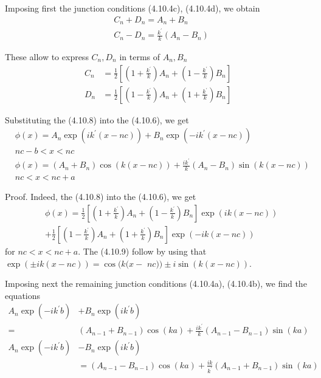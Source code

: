\documentclass{article}
\begin{document}
Imposing first the junction conditions (4.10.4c), (4.10.4d), we obtain
$$
\begin{align*}
& C_{n}+D_{n}=A_{n}+B_{n}  \tag{4.10.7a}\\
& C_{n}-D_{n}=\frac{k^{\prime}}{k}\left(A_{n}-B_{n}\right) \tag{4.10.7b}
\end{align*}
$$

These allow to express $C_{n}, D_{n}$ in terms of $A_{n}, B_{n}$
$$
\begin{align*}
C_{n} & =\frac{1}{2}\left[\left(1+\frac{k^{\prime}}{k}\right) A_{n}+\left(1-\frac{k^{\prime}}{k}\right) B_{n}\right]  \tag{4.10.8a}\\
D_{n} & =\frac{1}{2}\left[\left(1-\frac{k^{\prime}}{k}\right) A_{n}+\left(1+\frac{k^{\prime}}{k}\right) B_{n}\right] \tag{4.10.8b}
\end{align*}
$$

Substituting the (4.10.8) into the (4.10.6), we get
$$
\begin{align*}
& \phi(x)=A_{n} \exp \left(i k^{\prime}(x-n c)\right)+B_{n} \exp \left(-i k^{\prime}(x-n c)\right)  \tag{4.10.9a}\\
& n c-b<x<n c \\
& \phi(x)=\left(A_{n}+B_{n}\right) \cos (k(x-n c))+\frac{i k^{\prime}}{k}\left(A_{n}-B_{n}\right) \sin (k(x-n c))  \tag{4.10.9b}\\
& n c<x<n c+a
\end{align*}
$$

Proof. Indeed, the (4.10.8) into the (4.10.6), we get
$$
\begin{align*}
& \phi(x)=\frac{1}{2}\left[\left(1+\frac{k^{\prime}}{k}\right) A_{n}+\left(1-\frac{k^{\prime}}{k}\right) B_{n}\right] \exp (i k(x-n c))  \tag{4.10.10}\\
&+\frac{1}{2}\left[\left(1-\frac{k^{\prime}}{k}\right) A_{n}+\left(1+\frac{k^{\prime}}{k}\right) B_{n}\right] \exp (-i k(x-n c))
\end{align*}
$$
for $n c<x<n c+a$. The (4.10.9) follow by using that $\exp ( \pm i k(x-n c))=\cos (k(x-$ $n c)) \pm i \sin (k(x-n c))$.

Imposing next the remaining junction conditions (4.10.4a), (4.10.4b), we find the equations
$$
\begin{align*}
A_{n} \exp \left(-i k^{\prime} b\right) & +B_{n} \exp \left(i k^{\prime} b\right)  \tag{4.10.11a}\\
= & \left(A_{n-1}+B_{n-1}\right) \cos (k a)+\frac{i k^{\prime}}{k}\left(A_{n-1}-B_{n-1}\right) \sin (k a)
\end{align*}
$$
$$
\begin{align*}
A_{n} \exp \left(-i k^{\prime} b\right) & -B_{n} \exp \left(i k^{\prime} b\right)  \tag{4.10.11b}\\
& =\left(A_{n-1}-B_{n-1}\right) \cos (k a)+\frac{i k}{k^{\prime}}\left(A_{n-1}+B_{n-1}\right) \sin (k a)
\end{align*}
$$
\end{document}
